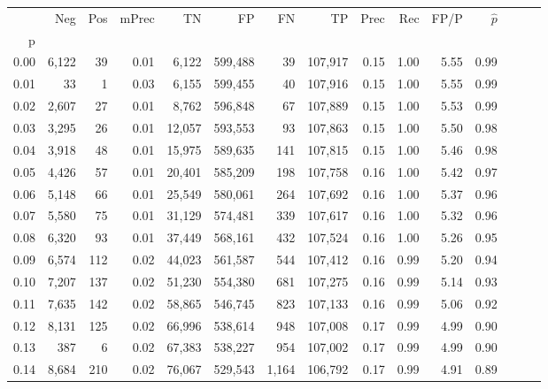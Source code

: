 \begin{tabular}{rrrrrrrrrrrrrrr}
\toprule
{} &     Neg &    Pos & mPrec &       TN &       FP &       FN &       TP &  Prec &   Rec &  FP/P & $\hat{p}$ \\
p    &         &        &       &          &          &          &          &       &       &       &           \\
\midrule
0.00 &   6,122 &     39 &  0.01 &    6,122 &  599,488 &       39 &  107,917 &  0.15 &  1.00 &  5.55 &      0.99 \\
0.01 &      33 &      1 &  0.03 &    6,155 &  599,455 &       40 &  107,916 &  0.15 &  1.00 &  5.55 &      0.99 \\
0.02 &   2,607 &     27 &  0.01 &    8,762 &  596,848 &       67 &  107,889 &  0.15 &  1.00 &  5.53 &      0.99 \\
0.03 &   3,295 &     26 &  0.01 &   12,057 &  593,553 &       93 &  107,863 &  0.15 &  1.00 &  5.50 &      0.98 \\
0.04 &   3,918 &     48 &  0.01 &   15,975 &  589,635 &      141 &  107,815 &  0.15 &  1.00 &  5.46 &      0.98 \\
0.05 &   4,426 &     57 &  0.01 &   20,401 &  585,209 &      198 &  107,758 &  0.16 &  1.00 &  5.42 &      0.97 \\
0.06 &   5,148 &     66 &  0.01 &   25,549 &  580,061 &      264 &  107,692 &  0.16 &  1.00 &  5.37 &      0.96 \\
0.07 &   5,580 &     75 &  0.01 &   31,129 &  574,481 &      339 &  107,617 &  0.16 &  1.00 &  5.32 &      0.96 \\
0.08 &   6,320 &     93 &  0.01 &   37,449 &  568,161 &      432 &  107,524 &  0.16 &  1.00 &  5.26 &      0.95 \\
0.09 &   6,574 &    112 &  0.02 &   44,023 &  561,587 &      544 &  107,412 &  0.16 &  0.99 &  5.20 &      0.94 \\
0.10 &   7,207 &    137 &  0.02 &   51,230 &  554,380 &      681 &  107,275 &  0.16 &  0.99 &  5.14 &      0.93 \\
0.11 &   7,635 &    142 &  0.02 &   58,865 &  546,745 &      823 &  107,133 &  0.16 &  0.99 &  5.06 &      0.92 \\
0.12 &   8,131 &    125 &  0.02 &   66,996 &  538,614 &      948 &  107,008 &  0.17 &  0.99 &  4.99 &      0.90 \\
0.13 &     387 &      6 &  0.02 &   67,383 &  538,227 &      954 &  107,002 &  0.17 &  0.99 &  4.99 &      0.90 \\
0.14 &   8,684 &    210 &  0.02 &   76,067 &  529,543 &    1,164 &  106,792 &  0.17 &  0.99 &  4.91 &      0.89 \\

\end{tabular}
